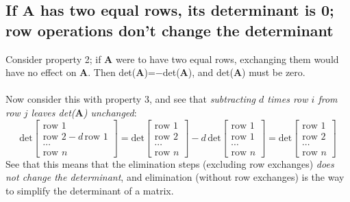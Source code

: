 \documentclass{report}
\begin{document}
\subsection{If $\bm A$ has two equal rows, its determinant is 0; row operations don't change the determinant}
Consider property 2; if $\bm A$ were to have two equal rows, exchanging them would have no effect on $\bm A$. Then det($\bm A$)=$-$det($\bm A$), 
and det($\bm A$) must be zero.\\
\vspace{1mm}\\
Now consider this with property 3, and see that \textit{subtracting $d$ times row $i$ from row $j$ leaves det($\bm A$) unchanged}:
\begin{equation*}
\text{det}\left[\begin{array}{c}
\text{row 1}\\\text{row 2}-d\,\text{row 1}\\\cdots\\\text{row $n$}
\end{array}\right]=
\text{det}\left[\begin{array}{c}
\text{row 1}\\\text{row 2}\\\cdots\\\text{row $n$}
\end{array}\right]
-d\,\text{det}\left[\begin{array}{c}
\text{row 1}\\\text{row 1}\\\cdots\\\text{row $n$}
\end{array}\right]=\text{det}\left[\begin{array}{c}
\text{row 1}\\\text{row 2}\\\cdots\\\text{row $n$}
\end{array}\right]
\end{equation*}
See that this means that the elimination steps (excluding row exchanges) \textit{does not change the determinant}, and elimination (without row exchanges) is the way to
simplify the determinant of a matrix.
\newpage
\end{document}
